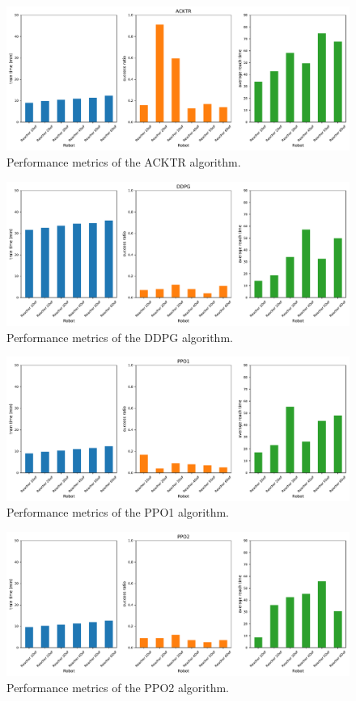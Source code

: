 \documentclass{article}
\begin{document}
\begin{figure}[H]
    \centering
    \includegraphics[width=\textwidth]{../ACKTR.pdf}
\caption{Performance metrics of the ACKTR algorithm.}
\end{figure}

\begin{figure}[H]
    \centering
    \includegraphics[width=\textwidth]{../DDPG.pdf}
\caption{Performance metrics of the DDPG algorithm.}
\end{figure}

\begin{figure}[H]
    \centering
    \includegraphics[width=\textwidth]{../PPO1.pdf}
\caption{Performance metrics of the PPO1 algorithm.}
\end{figure}

\begin{figure}[H]
    \centering
    \includegraphics[width=\textwidth]{../PPO2.pdf}
\caption{Performance metrics of the PPO2 algorithm.}
\end{figure}
\end{document}
